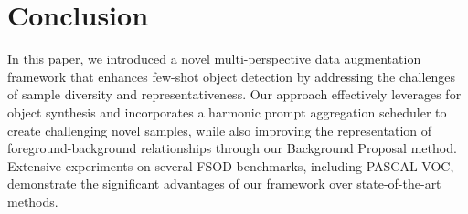 \section{Conclusion}
\label{sec:conclusion}

In this paper, we introduced a novel multi-perspective data augmentation framework that enhances few-shot object detection by addressing the challenges of sample diversity and representativeness. Our approach effectively leverages  for object synthesis and incorporates a harmonic prompt aggregation scheduler to create challenging novel samples, while also improving the representation of foreground-background relationships through our Background Proposal method. Extensive experiments on several FSOD benchmarks, including PASCAL VOC, demonstrate the significant advantages of our framework over state-of-the-art methods. 



